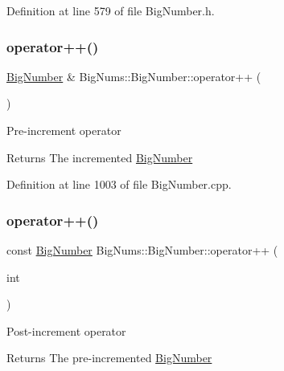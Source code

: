 Definition at line 579 of file Big\+Number.\+h.

\mbox{\label{class_big_nums_1_1_big_number_aac54f4e6e678b26552cef3dbcd18d41f}} 
\subsubsection{\texorpdfstring{operator++()}{operator++()}\hspace{0.1cm}{\footnotesize\ttfamily [1/2]}}
{\footnotesize\ttfamily \mbox{\hyperlink{class_big_nums_1_1_big_number}{Big\+Number}} \& Big\+Nums\+::\+Big\+Number\+::operator++ (\begin{DoxyParamCaption}{ }\end{DoxyParamCaption})}

Pre-\/increment operator \begin{DoxyReturn}{Returns}
The incremented \mbox{\hyperlink{class_big_nums_1_1_big_number}{Big\+Number}} 
\end{DoxyReturn}


Definition at line 1003 of file Big\+Number.\+cpp.

\mbox{\label{class_big_nums_1_1_big_number_a62c972147e0c20614fa6f2b3831b15b8}} 
\subsubsection{\texorpdfstring{operator++()}{operator++()}\hspace{0.1cm}{\footnotesize\ttfamily [2/2]}}
{\footnotesize\ttfamily const \mbox{\hyperlink{class_big_nums_1_1_big_number}{Big\+Number}} Big\+Nums\+::\+Big\+Number\+::operator++ (\begin{DoxyParamCaption}\item[{int}]{ }\end{DoxyParamCaption})}

Post-\/increment operator \begin{DoxyReturn}{Returns}
The pre-\/incremented \mbox{\hyperlink{class_big_nums_1_1_big_number}{Big\+Number}} 
\end{DoxyReturn}


